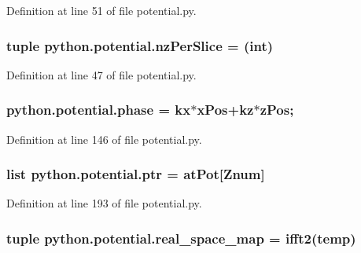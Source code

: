 Definition at line 51 of file potential.\-py.

\hypertarget{namespacepython_1_1potential_ac7c3e6e4deeb1cfa1e397a5fdb6c4049}{
\subsubsection[{nz\-Per\-Slice}]{\setlength{\rightskip}{0pt plus 5cm}tuple python.\-potential.\-nz\-Per\-Slice = (int)}}\label{namespacepython_1_1potential_ac7c3e6e4deeb1cfa1e397a5fdb6c4049}


Definition at line 47 of file potential.\-py.

\hypertarget{namespacepython_1_1potential_a3d6196f486a25bd8efc4cd069e197b51}{
\subsubsection[{phase}]{\setlength{\rightskip}{0pt plus 5cm}python.\-potential.\-phase = {\bf kx}$\ast${\bf x\-Pos}+{\bf kz}$\ast${\bf z\-Pos};}}\label{namespacepython_1_1potential_a3d6196f486a25bd8efc4cd069e197b51}


Definition at line 146 of file potential.\-py.

\hypertarget{namespacepython_1_1potential_ac9d23389c4f1cc2696d4ed06d3f7b2e6}{
\subsubsection[{ptr}]{\setlength{\rightskip}{0pt plus 5cm}list python.\-potential.\-ptr = {\bf at\-Pot}\mbox{[}Znum\mbox{]}}}\label{namespacepython_1_1potential_ac9d23389c4f1cc2696d4ed06d3f7b2e6}


Definition at line 193 of file potential.\-py.

\hypertarget{namespacepython_1_1potential_a8d11a79bb0bd21da3e706a40531f1f39}{
\subsubsection[{real\-\_\-space\-\_\-map}]{\setlength{\rightskip}{0pt plus 5cm}tuple python.\-potential.\-real\-\_\-space\-\_\-map = ifft2({\bf temp})}}\label{namespacepython_1_1potential_a8d11a79bb0bd21da3e706a40531f1f39}


